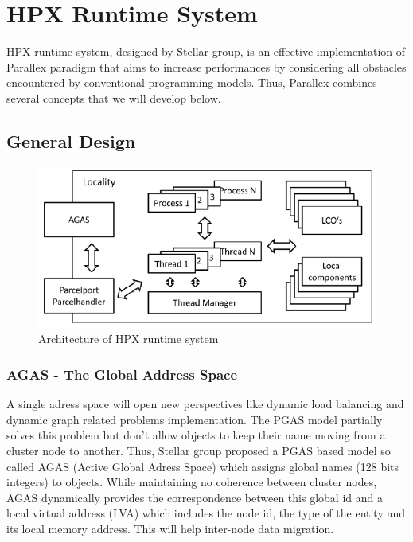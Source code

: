 \documentclass{llncs}
\begin{document}
\section{HPX Runtime System}\label{HPX}
HPX runtime system, designed by Stellar group, is an effective implementation of Parallex paradigm that aims to increase performances by considering all obstacles encountered by conventional programming models. Thus, Parallex combines several concepts that we will develop below.

\subsection{General Design}

\begin{figure}[h]
\begin{center}
\includegraphics[scale=0.55]{Images/Im4.png}
\end{center}
\caption{Architecture of HPX runtime system}
\label{ArchiHPX}
\end{figure}

\subsubsection{AGAS - The Global Address Space}
A single adress space will open new perspectives like dynamic load balancing and dynamic graph related problems implementation. The PGAS model \cite{PGAS} partially solves this problem but don't allow objects to keep their name moving from a cluster node to another. Thus, Stellar group proposed a PGAS based model so called AGAS (Active Global Adress Space) \cite{Parallex} which assigns global names (128 bits integers) to objects. While maintaining no coherence between cluster nodes, AGAS dynamically provides the correspondence between this global id and a local virtual address (LVA) \cite{Parallex} which includes the node id, the type of the entity and its local memory address. This will help inter-node data migration.
\end{document}
